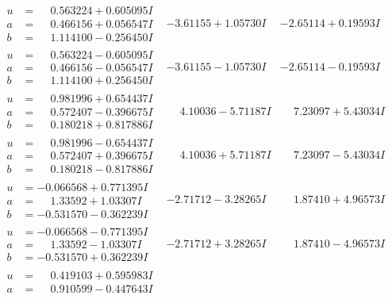 \documentclass[1p]{elsarticle_modified}
\theoremstyle{definition}
\begin{document}
$$\begin{array}{c|c|c}
\begin{aligned}
u &= \phantom{-}0.563224 + 0.605095 I \\
a &= \phantom{-}0.466156 + 0.056547 I \\
b &= \phantom{-}1.114100 - 0.256450 I\end{aligned}
 & -3.61155 + 1.05730 I & -2.65114 + 0.19593 I \\ \hline\begin{aligned}
u &= \phantom{-}0.563224 - 0.605095 I \\
a &= \phantom{-}0.466156 - 0.056547 I \\
b &= \phantom{-}1.114100 + 0.256450 I\end{aligned}
 & -3.61155 - 1.05730 I & -2.65114 - 0.19593 I \\ \hline\begin{aligned}
u &= \phantom{-}0.981996 + 0.654437 I \\
a &= \phantom{-}0.572407 - 0.396675 I \\
b &= \phantom{-}0.180218 + 0.817886 I\end{aligned}
 & \phantom{-}4.10036 - 5.71187 I & \phantom{-}7.23097 + 5.43034 I \\ \hline\begin{aligned}
u &= \phantom{-}0.981996 - 0.654437 I \\
a &= \phantom{-}0.572407 + 0.396675 I \\
b &= \phantom{-}0.180218 - 0.817886 I\end{aligned}
 & \phantom{-}4.10036 + 5.71187 I & \phantom{-}7.23097 - 5.43034 I \\ \hline\begin{aligned}
u &= -0.066568 + 0.771395 I \\
a &= \phantom{-}1.33592 + 1.03307 I \\
b &= -0.531570 - 0.362239 I\end{aligned}
 & -2.71712 - 3.28265 I & \phantom{-}1.87410 + 4.96573 I \\ \hline\begin{aligned}
u &= -0.066568 - 0.771395 I \\
a &= \phantom{-}1.33592 - 1.03307 I \\
b &= -0.531570 + 0.362239 I\end{aligned}
 & -2.71712 + 3.28265 I & \phantom{-}1.87410 - 4.96573 I \\ \hline\begin{aligned}
u &= \phantom{-}0.419103 + 0.595983 I \\
a &= \phantom{-}0.910599 - 0.447643 I \\

\end{aligned}
\end{array}$$
\end{document}
